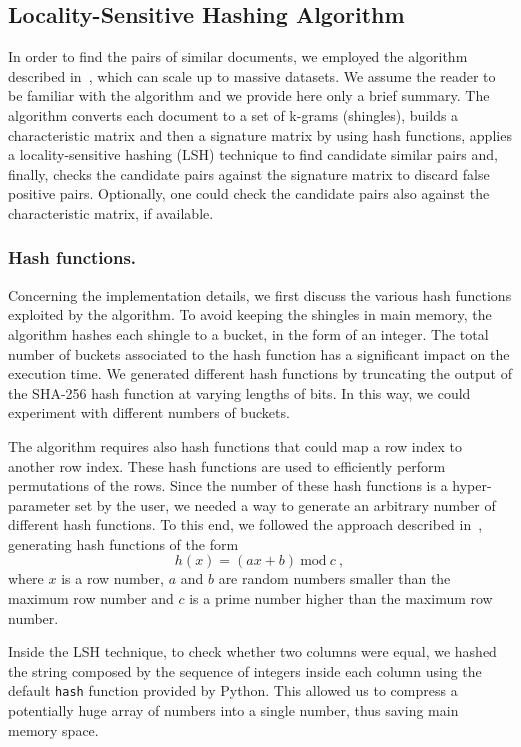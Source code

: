 \documentclass[runningheads]{llncs}
\begin{document}
\subsection{Locality-Sensitive Hashing Algorithm}
\label{subsec:models:lsh}

In order to find the pairs of similar documents, we employed the algorithm described in~\cite{leskovec_2020}, which can scale up to massive datasets. We assume the reader to be familiar with the algorithm and we provide here only a brief summary. The algorithm converts each document to a set of k-grams (shingles), builds a characteristic matrix and then a signature matrix by using hash functions, applies a locality-sensitive hashing (LSH) technique to find candidate similar pairs and, finally, checks the candidate pairs against the signature matrix to discard false positive pairs. Optionally, one could check the candidate pairs also against the characteristic matrix, if available.

\subsubsection{Hash functions.} Concerning the implementation details, we first discuss the various hash functions exploited by the algorithm. To avoid keeping the shingles in main memory, the algorithm hashes each shingle to a bucket, in the form of an integer. The total number of buckets associated to the hash function has a significant impact on the execution time. We generated different hash functions by truncating the output of the SHA-256 hash function at varying lengths of bits. In this way, we could experiment with different numbers of buckets.  

The algorithm requires also hash functions that could map a row index to another row index. These hash functions are used to efficiently perform permutations of the rows. Since the number of these hash functions is a hyper-parameter set by the user, we needed a way to generate an arbitrary number of different hash functions. To this end, we followed the approach described in~\cite{liu_2015}, generating hash functions of the form
\[
  h(x) = (ax + b)~\text{mod}~c~,  
\]
where $x$ is a row number, $a$ and $b$ are random numbers smaller than the maximum row number and $c$ is a prime number higher than the maximum row number.

Inside the LSH technique, to check whether two columns were equal, we hashed the string composed by the sequence of integers inside each column using the default \texttt{hash} function provided by Python. This allowed us to compress a potentially huge array of numbers into a single number, thus saving main memory space. 
\end{document}
